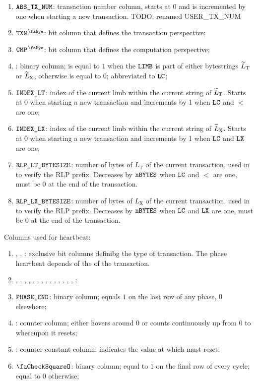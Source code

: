 \begin{enumerate}
    \item $\texttt{ABS\_TX\_NUM}$:
    transaction number column, starts at 0 and is incremented by one when starting a new transaction. TODO: renamed USER_TX_NUM
    \item $\isTxn$:
	bit column that defines the transaction perspective;
	\item $\isCmp$:
	bit column that defines the computation perspective;
	\item {}:
    binary column;
    is equal to $1$ when the $\texttt{LIMB}$ is part of either \rlp{} bytestrings $\widetilde{L}_{\mathrm{T}}$ or $\widetilde{L}_{\mathrm{X}}$, otherwise is equal to $0$;
    abbreviated to $\texttt{LC}$;
    \item $\texttt{INDEX\_LT}$:
    index of the current limb within the current string of $\widetilde{L}_{\mathrm{T}}$. Starts at 0 when starting a new transaction and increments by 1 when $\texttt{LC}$ and $\lt$ are one; 
    \item $\texttt{INDEX\_LX}$:                                                       
    index of the current limb within the current string of $\widetilde{L}_{\mathrm{X}}$. Starts at 0 when starting a new transaction and increments by 1 when $\texttt{LC}$ and $\texttt{LX}$ are one;
    \item $\texttt{RLP\_LT\_BYTESIZE}$:
    number of bytes of $L_{\mathrm{T}}$ of the current transaction, used in \phaseRlpPrefix{} to verify the RLP prefix. Decreases by $\texttt{nBYTES}$ when $\texttt{LC}$ and $\lt$ are one, must be 0 at the end of the transaction.
    \item $\texttt{RLP\_LX\_BYTESIZE}$:
    number of bytes of $L_{\mathrm{X}}$ of the current transaction, used in \phaseRlpPrefix{} to verify the RLP prefix. Decreases by $\texttt{nBYTES}$ when $\texttt{LC}$ and $\texttt{LX}$ are one, must be 0 at the end of the transaction.
\end{enumerate}
Columns used for heartbeat:
\begin{enumerate}[resume]
    \item \typeZeroTx{}, \typeOneTx{}, \typeTwoTx{}:
    exclusive bit columns definibg the type of transaction. The phase heartbeat depends of the \transactionType{} of the transaction.
    \item \phaseRlpPrefix{}, \phaseChainId{}, \phaseNonce{}, \phaseGasPrice{}, \phaseMaxPriorityFeePerGas{}, \phaseMaxFeePerGas{}, \phaseGasLimit{}, \phaseTo{}, \phaseValue{}, \phaseData{}, \phaseAccessList{}, \phaseBeta{}, \phaseY{}, \phaseR{}, \phaseS{}:
    \item $\texttt{PHASE\_END}$:
    binary column; equals $1$ on the last row of any phase, $0$ elsewhere;
    \item \ct{}:
	counter column; 
	either hovers around $0$ or counts continuously up from $0$ to \maxCt{} whereupon it resets;
    \item \maxCt:
	counter-constant column;
	indicates the value at which \ct{} must reset;
	\item $\done$:
    binary column; equal to $1$ on the final row of every \ct{} cycle; equal to $0$ otherwise;
\end{enumerate}

